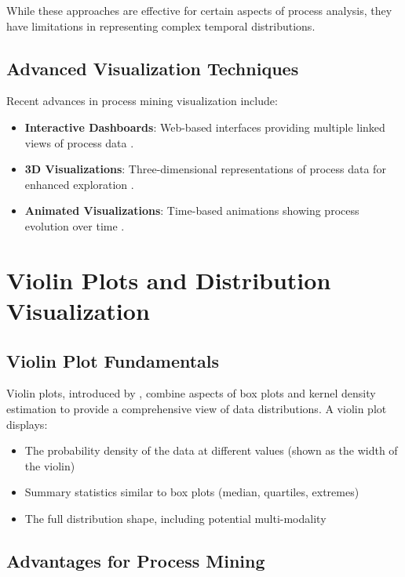 While these approaches are effective for certain aspects of process analysis, they have limitations in representing complex temporal distributions.

\subsection{Advanced Visualization Techniques}
\label{subsec:advanced_viz}

Recent advances in process mining visualization include:

\begin{itemize}
    \item \textbf{Interactive Dashboards}: Web-based interfaces providing multiple linked views of process data \cite{leemans2019interactive}.
    \item \textbf{3D Visualizations}: Three-dimensional representations of process data for enhanced exploration \cite{beck20173d}.
    \item \textbf{Animated Visualizations}: Time-based animations showing process evolution over time \cite{bodesinsky2016animated}.
\end{itemize}

\section{Violin Plots and Distribution Visualization}
\label{sec:violin_plots}

\subsection{Violin Plot Fundamentals}
\label{subsec:violin_fundamentals}

Violin plots, introduced by \cite{hintze1998violin}, combine aspects of box plots and kernel density estimation to provide a comprehensive view of data distributions. A violin plot displays:

\begin{itemize}
    \item The probability density of the data at different values (shown as the width of the violin)
    \item Summary statistics similar to box plots (median, quartiles, extremes)
    \item The full distribution shape, including potential multi-modality
\end{itemize}

\subsection{Advantages for Process Mining}
\label{subsec:violin_advantages}

